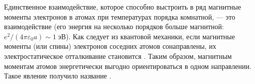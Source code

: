 Единственное взаимодействие, которое способно выстроить в ряд магнитные
моменты электронов в атомах при температурах порядка комнатной, --- это
 взаимодействие
(его энергия на несколько порядков больше магнитной:
$e^2/(4\pi\varepsilon_0 a) \sim 1\;эВ$).
Как следует из квантовой механики, если магнитные моменты (или спины) электронов
соседних атомов сонаправлены,
их электростатическое отталкивание становится .
Таким образом, магнитным моментам атомов энергетически выгодно ориентироваться
в одном направлении. Такое явление получило название
.

%



